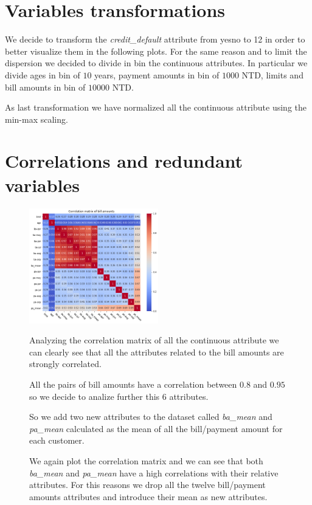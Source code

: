 \section{Variables transformations}

We decide to transform the \textit{credit\_default} attribute from yes\/no to 1\/2 in order to better visualize them in the following plots. For the same reason and to limit the dispersion we decided to divide in bin the continuous attributes. In particular we divide ages in bin of $10$ years, payment amounts in bin of $1000$ NTD, limits and bill amounts in bin of $10000$ NTD.

As last transformation we have normalized all the continuous attribute using the min-max scaling.

\section{Correlations and redundant variables}

\begin{figure}[h]
  \begin{minipage}[h]{.95\textwidth}
  
    \begin{floatingfigure}[r]{0.50\textwidth}
        \mbox{\includegraphics[width=0.50\textwidth]{img/ch2/correlation_matrix_ba}}
    \end{floatingfigure}

  Analyzing the correlation matrix of all the continuous attribute we can clearly see that all the attributes related to the bill amounts are strongly correlated.

  All the pairs of bill amounts have a correlation between $0.8$ and $0.95$ so we decide to analize further this $6$ attributes.
    
  
  So we add two new attributes to the dataset called \textit{ba\_mean} and \textit{pa\_mean} calculated as the mean of all the bill/payment amount for each customer.
  
  We again plot the correlation matrix and we can see that both \textit{ba\_mean} and \textit{pa\_mean} have a high correlations with their relative attributes. For this reasons we drop all the twelve bill/payment amounts attributes and introduce their mean as new attributes. 
    
  \end{minipage}
\end{figure}
